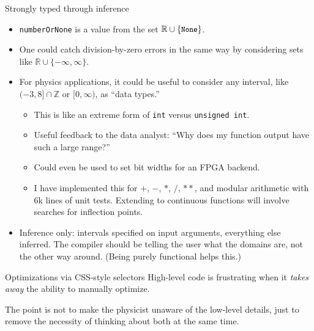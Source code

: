 \documentclass{beamer}
\begin{document}
\begin{frame}{Strongly typed through inference}
\vspace{0.3 cm}
\begin{itemize}
\item<1-> {\tt \small numberOrNone} is a value from the set $\mathbb{R} \cup \{\mbox{\tt \small None}\}$.

\item<2-> One could catch division-by-zero errors in the same way by considering sets like $\mathbb{R} \cup \{-\infty, \infty\}$.

\item<3-> For physics applications, it could be useful to consider any interval, like $(-3, 8] \cap \mathbb{Z}$ or $[0, \infty)$, as ``data types.''
\begin{itemize}
\item<4-> This is like an extreme form of {\tt \small int} versus {\tt \small unsigned int}.
\item<4-> Useful feedback to the data analyst: ``Why does my function output have such a large range?''
\item<4-> Could even be used to set bit widths for an FPGA backend.
\item<4-> I have implemented this for $+$, $-$, $*$, $/$, $**$, and modular arithmetic with 6k lines of unit tests. Extending to continuous functions will involve searches for inflection points.
\end{itemize}
\item<5-> Inference only: intervals specified on input arguments, everything else inferred. The compiler should be telling the user what the domains are, not the other way around. (Being purely functional helps this.)
\end{itemize}
\end{frame}

\begin{frame}{Optimizations via CSS-style selectors}
\vfill
High-level code is frustrating when it {\it takes away} the ability to manually optimize.

\vfill
The point is not to make the physicist unaware of the low-level details, just to remove the necessity of thinking about both at the same time.

\vfill
{}
\end{frame}
\end{document}
